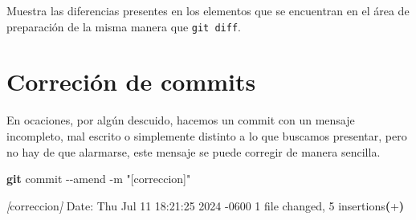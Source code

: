 \documentclass[
]{book}
\newenvironment{Shaded}{\begin{snugshade}}{\end{snugshade}}
\newcommand{\AttributeTok}[1]{\textcolor[rgb]{0.13,0.29,0.53}{#1}}
\newcommand{\DataTypeTok}[1]{\textcolor[rgb]{0.13,0.29,0.53}{#1}}
\newcommand{\ErrorTok}[1]{\textcolor[rgb]{0.64,0.00,0.00}{\textbf{#1}}}
\newcommand{\ExtensionTok}[1]{#1}
\newcommand{\FunctionTok}[1]{\textcolor[rgb]{0.13,0.29,0.53}{\textbf{#1}}}
\newcommand{\KeywordTok}[1]{\textcolor[rgb]{0.13,0.29,0.53}{\textbf{#1}}}
\newcommand{\NormalTok}[1]{#1}
\newcommand{\PreprocessorTok}[1]{\textcolor[rgb]{0.56,0.35,0.01}{\textit{#1}}}
\newcommand{\SpecialStringTok}[1]{\textcolor[rgb]{0.31,0.60,0.02}{#1}}
\newcommand{\StringTok}[1]{\textcolor[rgb]{0.31,0.60,0.02}{#1}}
\newcommand{\VariableTok}[1]{\textcolor[rgb]{0.00,0.00,0.00}{#1}}
\begin{document}
\begin{Shaded}
\end{Shaded}

Muestra las diferencias presentes en los elementos que se encuentran en el área de preparación de la misma manera que \texttt{git\ diff}.

\section{Correción de commits}\label{correciuxf3n-de-commits}

En ocaciones, por algún descuido, hacemos un commit con un mensaje incompleto, mal escrito o simplemente distinto a lo que buscamos presentar, pero no hay de que alarmarse, este mensaje se puede corregir de manera sencilla.

\begin{Shaded}
\begin{Highlighting}[]
\FunctionTok{git}\NormalTok{ commit }\AttributeTok{{-}{-}amend} \AttributeTok{{-}m} \StringTok{"[correccion]"}
\end{Highlighting}
\end{Shaded}

\begin{Shaded}
\begin{Highlighting}[]
\ExtensionTok{[main}\NormalTok{ 9d520f3] }\PreprocessorTok{[}\SpecialStringTok{correccion}\PreprocessorTok{]}
 \ExtensionTok{Date:}\NormalTok{ Thu Jul 11 18:21:25 2024 }\AttributeTok{{-}0600}
 \ExtensionTok{1}\NormalTok{ file changed, 5 insertions}\ErrorTok{(}\ExtensionTok{+}\KeywordTok{)}
\end{Highlighting}
\end{Shaded}
\end{document}
